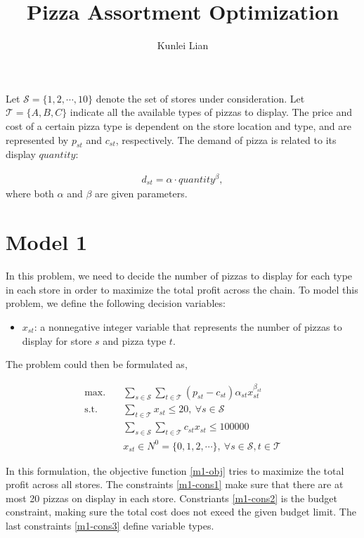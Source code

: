 \documentclass[a4, 11pt]{article}
\begin{document}
\title{\vspace{-4cm}Pizza Assortment Optimization}
\author{Kunlei Lian}
\maketitle

Let $\mathcal{S} = \{1, 2, \cdots, 10\}$ denote the set of stores under consideration.
Let $\mathcal{T} = \{A, B, C\}$ indicate all the available types of pizzas to display.
The price and cost of a certain pizza type is dependent on the store location and type, and are represented by $p_{st}$ and $c_{st}$, respectively.
The demand of pizza is related to its display $quantity$:

\begin{align}
	d_{st} = \alpha \cdot quantity^{\beta},
\end{align} 
where both $\alpha$ and $\beta$ are given parameters.

\section{Model 1}
In this problem, we need to decide the number of pizzas to display for each type in each store in order to maximize the total profit across the chain.
To model this problem, we define the following decision variables:

\begin{itemize}
	\item $x_{st}$: a nonnegative integer variable that represents the number of pizzas to display for store $s$ and pizza type $t$.
\end{itemize}

The problem could then be formulated as,

\begin{align}
	\text{max.} &\quad \sum_{s \in \mathcal{S}} \sum_{t \in \mathcal{T}} (p_{st} - c_{st}) \alpha_{st} x_{st}^{\beta_{st}} \label{m1-obj} \\
	\text{s.t.} &\quad  \sum_{t \in \mathcal{T}} x_{st} \leq 20, \ \forall s \in \mathcal{S} \label{m1-cons1} \\
	&\quad \sum_{s \in \mathcal{S}} \sum_{t \in \mathcal{T}} c_{st} x_{st} \leq 100000 \label{m1-cons2} \\
	&\quad x_{st} \in N^0 = \{0, 1, 2, \cdots\}, \ \forall s \in \mathcal{S}, t \in \mathcal{T} \label{m1-cons3}
\end{align}

In this formulation, the objective function \eqref{m1-obj} tries to maximize the total profit across all stores.
The constraints \eqref{m1-cons1} make sure that there are at most 20 pizzas on display in each store.
Constriants \eqref{m1-cons2} is the budget constraint, making sure the total cost does not exeed the given budget limit.
The last constraints \eqref{m1-cons3} define variable types.
\end{document}
